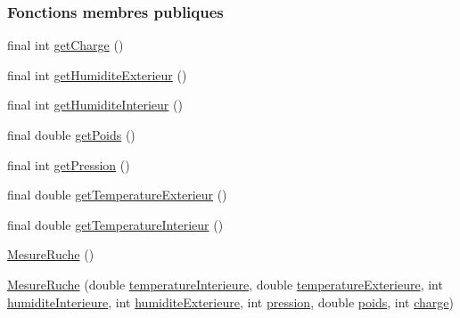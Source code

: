 \subsubsection*{Fonctions membres publiques}
\begin{DoxyCompactItemize}
\item 
final int \hyperlink{classcom_1_1example_1_1bee__honeyt_1_1_mesure_ruche_a5fb489924272149140eb7a4c81cacaec}{get\+Charge} ()
\item 
final int \hyperlink{classcom_1_1example_1_1bee__honeyt_1_1_mesure_ruche_ab16738883de0f1535d25bc36b828cc7a}{get\+Humidite\+Exterieur} ()
\item 
final int \hyperlink{classcom_1_1example_1_1bee__honeyt_1_1_mesure_ruche_af78ac1f237287bff4e1a36bebf8bbeef}{get\+Humidite\+Interieur} ()
\item 
final double \hyperlink{classcom_1_1example_1_1bee__honeyt_1_1_mesure_ruche_aff130b4038e223f3ec83769fc354a007}{get\+Poids} ()
\item 
final int \hyperlink{classcom_1_1example_1_1bee__honeyt_1_1_mesure_ruche_a68c21cc141b1103fb3746075657bd4fd}{get\+Pression} ()
\item 
final double \hyperlink{classcom_1_1example_1_1bee__honeyt_1_1_mesure_ruche_a8628b499066f185d78ae015ce50557a8}{get\+Temperature\+Exterieur} ()
\item 
final double \hyperlink{classcom_1_1example_1_1bee__honeyt_1_1_mesure_ruche_ab552e0788fc7dba1e9ef83a0fce861f8}{get\+Temperature\+Interieur} ()
\item 
\hyperlink{classcom_1_1example_1_1bee__honeyt_1_1_mesure_ruche_a3be117936bbcf591ae1a48b6c391f069}{Mesure\+Ruche} ()
\item 
\hyperlink{classcom_1_1example_1_1bee__honeyt_1_1_mesure_ruche_ab9e1fdc4825a5fda8172e6973ce7ec31}{Mesure\+Ruche} (double \hyperlink{classcom_1_1example_1_1bee__honeyt_1_1_mesure_ruche_afd0ecabb4e519d5bcfee33ac15b8b742}{temperature\+Interieure}, double \hyperlink{classcom_1_1example_1_1bee__honeyt_1_1_mesure_ruche_ac13ff0ed6c96cf755097510acf202521}{temperature\+Exterieure}, int \hyperlink{classcom_1_1example_1_1bee__honeyt_1_1_mesure_ruche_a3b5d2536649e0acaf1eebeba4409c9bb}{humidite\+Interieure}, int \hyperlink{classcom_1_1example_1_1bee__honeyt_1_1_mesure_ruche_aa5521e97dfa98051bff9fd8d3ca3f34d}{humidite\+Exterieure}, int \hyperlink{classcom_1_1example_1_1bee__honeyt_1_1_mesure_ruche_ae78080a6d5745faa411e3cfbdbf8aeec}{pression}, double \hyperlink{classcom_1_1example_1_1bee__honeyt_1_1_mesure_ruche_a9aa6c575b7b69c4fb3825944e1f50722}{poids}, int \hyperlink{classcom_1_1example_1_1bee__honeyt_1_1_mesure_ruche_a5ac02bc1d6195faa400e5a3171eed3f4}{charge})

\end{DoxyCompactItemize}
